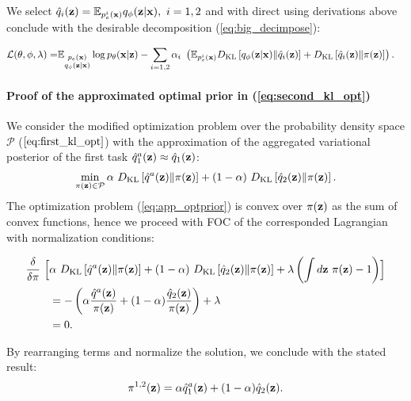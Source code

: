 We select $\hat{q}_{i}({\mathbf{z}}) = \mathbb{E}_{p^{i}_{e}({\mathbf{x}})}q_{\phi}({\mathbf{z}}|{\mathbf{x}}),~i=1,2$ and with direct using derivations above conclude with the desirable decomposition (\ref{eq:big_decimpose}):
\begin{fullwidth}
\begin{equation}
    \begin{aligned}
     \mathcal{L}(\theta, \phi, \lambda) = & \mathbb{E}_{\substack{p_{e}({\mathbf{x}})\\q_{\phi}({\mathbf{z}}|{\mathbf{x}})}}\log p_{\theta}({\mathbf{x}}|{\mathbf{z}})  - \sum\limits_{i=1,2}\alpha_i~\left( \mathbb{E}_{p^i_{e}({\mathbf{x}})}D_{\mathrm{KL}}\left[q_{\phi}({\mathbf{z}}|{\mathbf{x}})\|\hat{q}_{i}({\mathbf{z}})\right]+ D_{\mathrm{KL}}\left[\hat{q}_{i}({\mathbf{z}})\|\pi({\mathbf{z}})\right]\right).
    \end{aligned}
\end{equation}
\end{fullwidth}
\paragraph{Proof of the approximated optimal prior in (\ref{eq:second_kl_opt})}
We consider the modified optimization problem over the probability density space $\mathcal{P}$ ($\ref{eq:first_kl_opt}$) with the approximation of the aggregated variational posterior of the first task
$\hat{q}_{1}^{a}({\mathbf{z}})\approx\hat{q}_{1}({\mathbf{z}})$:
\begin{equation}
\label{eq:app_optprior}
    \begin{aligned}
    \min\limits_{\pi(\rvz)\in\mathcal{P}}\alpha~\KL{\hat{q}^{a}(\rvz)}{\pi(\rvz)}  + (1-\alpha)~\KL{\hat{q}_{2}(\rvz)}{\pi(\rvz)}.
    \end{aligned}
\end{equation}
The optimization problem (\ref{eq:app_optprior}) is convex over $\pi({\mathbf{z}})$ as the sum of convex functions, hence we proceed with FOC of the corresponded Lagrangian with normalization conditions:
\begin{fullwidth}
\begin{equation}
    \begin{aligned}
     \frac{\delta}{\delta\pi} ~\Bigl[&\alpha~D_{\mathrm{KL}}\left[\hat{q}^{a}({\mathbf{z}})\|\pi({\mathbf{z}})\right] + (1-\alpha)~D_{\mathrm{KL}}\left[\hat{q}_{2}({\mathbf{z}})\|\pi({\mathbf{z}})\right]  + \lambda \left(\int d{\mathbf{z}}~\pi({\mathbf{z}}) - 1 \right)\Bigr]  \\
     &= - \left(\alpha \frac{\hat{q}^{a}({\mathbf{z}})}{\pi({\mathbf{z}})} + (1-\alpha)\frac{\hat{q}_{2}({\mathbf{z}})}{\pi({\mathbf{z}})}\right) + \lambda \\
     &= 0.
    \end{aligned}
\end{equation}
\end{fullwidth}
By rearranging terms and normalize the solution, we conclude with the stated result:
\begin{equation}
    \begin{aligned}
    \pi^{1,2}({\mathbf{z}}) = \alpha \hat{q}_{1}^{a}({\mathbf{z}}) + (1-\alpha) \hat{q}_{2}({\mathbf{z}}).
    \end{aligned}
\end{equation}
